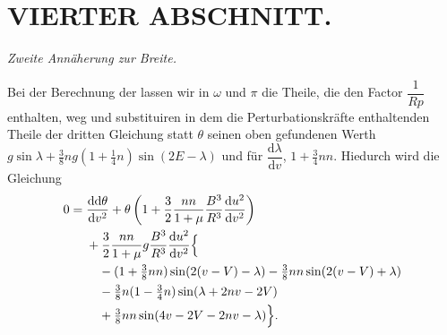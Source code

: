 \clearpage
\begingroup
{}
\renewcommand{\headrulewidth}{0pt}
\section*{VIERTER ABSCHNITT.}
\begin{center}
\itshape Zweite Annäherung zur Breite.
\end{center}

\par\noindent\hspace*{\parindent}Bei der Berechnung der  lassen wir in \(\omega\) und \(\pi\) die Theile, die
den Factor \(\dfrac{1}{Rp}\) enthalten, weg und substituiren in dem die Perturbationskräfte
enthaltenden Theile der dritten Gleichung statt \(\theta\) seinen oben gefundenen
Werth \(g\sin\lambda+\tfrac38ng(1+\tfrac14n)\sin(2E-\lambda)\) und für
\(\dfrac{\mathrm{d}\lambda}{\mathrm{d}v}\), \(1+\tfrac34nn\). Hiedurch wird die Gleichung
\[
\begin{aligned}
0={}&\frac{\mathrm{dd}\theta}{\mathrm{d}v^2}
+\theta\left(1+\frac32\frac{nn}{1+\mu}\frac{B^3}{R^3}
\frac{\mathrm{d}u^2}{\mathrm{d}v^2}\right)\\
&+\frac32\frac{nn}{1+\mu}g\frac{B^3}{R^3}\frac{\mathrm{d}u^2}{\mathrm{d}v^2}\Bigl\{\\
&\quad -(1+\tfrac38nn)\sin(2(v-V)-\lambda)
-\tfrac38nn\sin(2(v-V)+\lambda)\\
&\quad -\tfrac38n(1-\tfrac34n)\sin(\lambda+2nv-2V)\\
&\quad +\tfrac38nn\sin(4v-2V-2nv-\lambda)\Bigr\}.
\end{aligned}
\]

